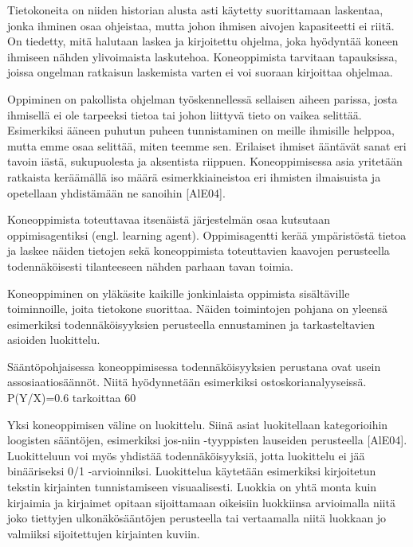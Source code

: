 \documentclass[finnish]{tktltiki2}
\theoremstyle{definition}
\theoremstyle{remark}
\begin{document}
Tietokoneita on niiden historian alusta asti käytetty suorittamaan laskentaa, jonka ihminen osaa ohjeistaa, mutta johon ihmisen aivojen kapasiteetti ei riitä. On tiedetty, mitä halutaan laskea ja kirjoitettu ohjelma, joka hyödyntää koneen ihmiseen nähden ylivoimaista laskutehoa. Koneoppimista tarvitaan tapauksissa, joissa ongelman ratkaisun laskemista varten ei voi suoraan kirjoittaa ohjelmaa. 
 
Oppiminen on pakollista ohjelman työskennellessä sellaisen aiheen parissa, josta ihmisellä ei ole tarpeeksi tietoa tai johon liittyvä tieto on vaikea selittää. Esimerkiksi ääneen puhutun puheen tunnistaminen on meille ihmisille helppoa, mutta emme osaa selittää, miten teemme sen. Erilaiset ihmiset ääntävät sanat eri tavoin iästä, sukupuolesta ja aksentista riippuen. Koneoppimisessa asia yritetään ratkaista keräämällä iso määrä esimerkkiaineistoa eri ihmisten ilmaisuista ja opetellaan yhdistämään ne sanoihin [AlE04]. 
 
Koneoppimista toteuttavaa itsenäistä järjestelmän osaa kutsutaan oppimisagentiksi (engl. learning agent). Oppimisagentti kerää ympäristöstä tietoa ja laskee näiden tietojen sekä koneoppimista toteuttavien kaavojen perusteella todennäköisesti tilanteeseen nähden parhaan tavan toimia. 
 
Koneoppiminen on yläkäsite kaikille jonkinlaista oppimista sisältäville toiminnoille, joita tietokone suorittaa. Näiden toimintojen pohjana on yleensä esimerkiksi todennäköisyyksien perusteella ennustaminen ja tarkasteltavien asioiden luokittelu. 
 
Sääntöpohjaisessa koneoppimisessa todennäköisyyksien perustana ovat usein assosiaatiosäännöt. Niitä hyödynnetään esimerkiksi ostoskorianalyyseissä. P(Y/X)=0.6 tarkoittaa 60 %
 
Yksi koneoppimisen väline on luokittelu. Siinä asiat luokitellaan kategorioihin loogisten sääntöjen, esimerkiksi jos-niin -tyyppisten lauseiden perusteella [AlE04]. Luokitteluun voi myös yhdistää todennäköisyyksiä, jotta luokittelu ei jää binääriseksi 0/1 -arvioinniksi. Luokittelua käytetään esimerkiksi kirjoitetun tekstin kirjainten tunnistamiseen visuaalisesti. Luokkia on yhtä monta kuin kirjaimia ja kirjaimet opitaan sijoittamaan oikeisiin luokkiinsa arvioimalla niitä joko tiettyjen ulkonäkösääntöjen perusteella tai vertaamalla niitä luokkaan jo valmiiksi sijoitettujen kirjainten kuviin. 
 
\end{document}

